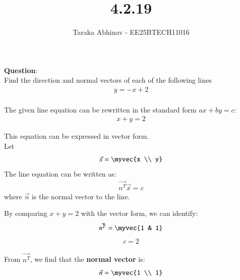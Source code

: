 \documentclass[journal]{IEEEtran}
\begin{document}

\vspace{3cm}

\title{4.2.19}
\author{Taraka Abhinav - EE25BTECH11016}
\maketitle
{\let\newpage\relax\maketitle}

\renewcommand{\thefigure}{\theenumi}
\renewcommand{\thetable}{\theenumi}
\setlength{\intextsep}{10pt} %


\renewcommand{\thetable}{\theenumi}

\textbf{Question}:\\
Find the direction and normal vectors of each of the following lines
\begin{align}
y = -x + 2
\end{align}
\solution \\

The given line equation can be rewritten in the standard form $ax + by = c$:
\begin{align}
x + y = 2
\end{align}

This equation can be expressed in vector form.\\
Let
\begin{align}
\vec{x} = \myvec{x \\ y}
\end{align}
The line equation can be written as:
\begin{align}
\vec{n^T}  \vec{x} = c
\end{align}
where $\vec{n}$ is the normal vector to the line.

By comparing $x + y = 2$ with the vector form, we can identify:
\begin{align}
\vec{n^T} = \myvec{1 & 1}
\end{align}
\begin{align}
c = 2
\end{align}

From $\vec{n^T}$, we find that the \textbf{normal vector} is:
\begin{align}
\vec{n} = \myvec{1 \\ 1}
\end{align}
\end{document}
